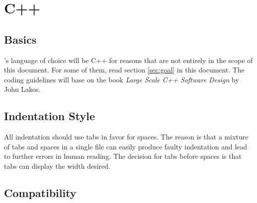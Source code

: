 %

\chapter{C++}
\label{cha:C++}


\section{Basics}
\label{sec:basics}


\SYNEIGHT's language of choice will be C++ for reasons that are not
entirely in the scope of this document. For some of them, read
section \vref{sec:goal} in this document. The coding guidelines will base on
the book \emph{Large Scale C++ Software Design} by John Lakos.


\section{Indentation Style}
\label{sec:indentation-style}

All indentation should use tabs in favor for spaces. The reason is
that a mixture of tabs and spaces in a single file can easily produce
faulty indentation and lead to further errors in human reading. The
decision for tabs before spaces is that tabs can display the width
desired.


\section{Compatibility}
\label{sec:compatibility}

